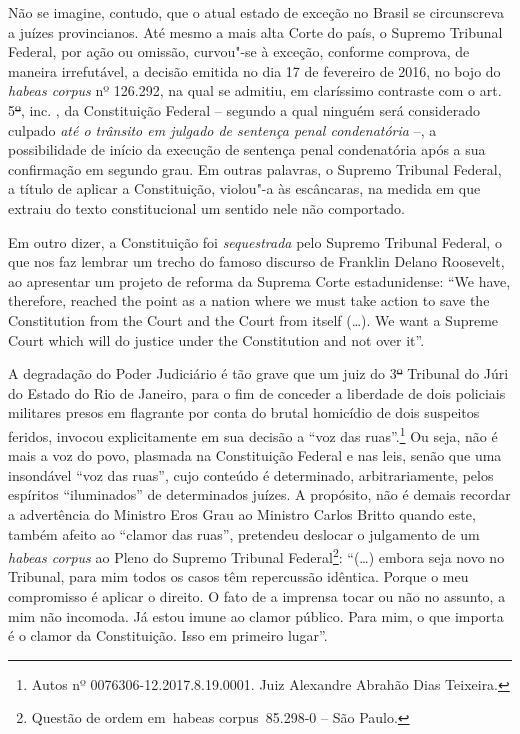 Não se imagine, contudo, que o atual estado de exceção no Brasil se
circunscreva a juízes provincianos. Até mesmo a mais alta Corte do país,
o Supremo Tribunal Federal, por ação ou omissão, curvou"-se à exceção,
conforme comprova, de maneira irrefutável, a decisão emitida no dia 17
de fevereiro de 2016, no bojo do \emph{habeas corpus} nº 126.292, na
qual se admitiu, em claríssimo contraste com o art. 5\sout{º}, inc.
, da Constituição Federal -- segundo a qual ninguém será considerado
culpado \emph{até o trânsito em julgado de sentença penal condenatória}
--, a possibilidade de início da execução de sentença penal condenatória
após a sua confirmação em segundo grau. Em outras palavras, o Supremo
Tribunal Federal, a título de aplicar a Constituição, violou"-a às
escâncaras, na medida em que extraiu do texto constitucional um sentido
nele não comportado.

Em outro dizer, a Constituição foi \emph{sequestrada} pelo Supremo
Tribunal Federal, o que nos faz lembrar um trecho do famoso discurso de
Franklin Delano Roosevelt, ao apresentar um projeto de reforma da
Suprema Corte estadunidense: ``We have, therefore, reached the point as
a nation where we must take action to save the Constitution from the
Court and the Court from itself (\ldots{}). We want a Supreme Court which
will do justice under the Constitution and not over it''.

A degradação do Poder Judiciário é tão grave que um juiz do 3\sout{º}
Tribunal do Júri do Estado do Rio de Janeiro, para o fim de conceder a
liberdade de dois policiais militares presos em flagrante por conta do
brutal homicídio de dois suspeitos feridos, invocou explicitamente em
sua decisão a ``voz das ruas''.\footnote{Autos nº
  0076306-12.2017.8.19.0001. Juiz Alexandre Abrahão Dias Teixeira.} Ou
seja, não é mais a voz do povo, plasmada na Constituição Federal e nas
leis, senão que uma insondável ``voz das ruas'', cujo conteúdo é
determinado, arbitrariamente, pelos espíritos ``iluminados'' de
determinados juízes. A propósito, não é demais recordar a advertência do
Ministro Eros Grau ao Ministro Carlos Britto quando este, também afeito
ao ``clamor das ruas'', pretendeu deslocar o julgamento de um
\emph{habeas corpus} ao Pleno do Supremo Tribunal Federal\footnote{Questão
  de ordem em~habeas corpus~85.298-0 -- São Paulo.}: ``(\ldots{}) embora seja
novo no Tribunal, para mim todos os casos têm repercussão idêntica.
Porque o meu compromisso é aplicar o direito. O fato de a imprensa tocar
ou não no assunto, a mim não incomoda. Já estou imune ao clamor público.
Para mim, o que importa é o clamor da Constituição. Isso em primeiro
lugar''.

